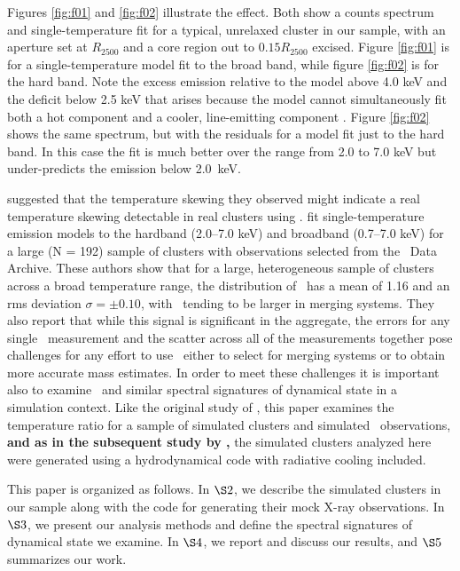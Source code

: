 \documentclass[12pt,preprint]{aastex}
\begin{document}
Figures \ref{fig:f01} and \ref{fig:f02} illustrate the
effect.  Both show a counts spectrum and single-temperature fit for a
typical, unrelaxed cluster in our sample, with an aperture set at
$R_{2500}$ and a core region out to $0.15 R_{2500}$ excised.  Figure
\ref{fig:f01} is for a single-temperature model fit to the broad band,
while figure \ref{fig:f02} is for the hard band.  Note the excess
emission relative to the model above 4.0 keV and the deficit below 2.5
keV that arises because the model cannot simultaneously fit both a hot
component and a cooler, line-emitting component
\citep{2004MNRAS.354...10M}. Figure \ref{fig:f02} shows the same
spectrum, but with the residuals for a model fit just to the hard
band.  In this case the fit is much better over the range from 2.0 to
7.0 keV but under-predicts the emission below 2.0~keV.

\cite{mathiesen_four_2001} suggested that the temperature skewing they
observed might indicate a real temperature skewing detectable in real
clusters using \chandra.  \cite{cavagnolo_bandpass_2008} fit
single-temperature emission models to the hardband (2.0--7.0 keV) and
broadband (0.7--7.0 keV) for a large (N = 192) sample of clusters with
observations selected from the \chandra\ Data Archive.  These authors
show that for a large, heterogeneous sample of clusters across a broad
temperature range, the distribution of \thbr\ has a mean of 1.16 and
an rms deviation $\sigma = \pm0.10$, with \thbr\ tending to be larger
in merging systems.  They also report that while this signal is
significant in the aggregate, the errors for any single \thbr\
measurement and the scatter across all of the measurements together
pose challenges for any effort to use \thbr\ either to select for
merging systems or to obtain more accurate mass estimates.  In order
to meet these challenges it is important also to examine \thbr\ and
similar spectral signatures of dynamical state in a simulation
context.  Like the original study of \cite{mathiesen_four_2001}, this
paper examines the temperature ratio for a sample of simulated
clusters and simulated \chandra\ observations, 
{\bf and as in the subsequent study by \cite{valdarnini_substructure_2006}, }
the simulated clusters analyzed here were generated using a hydrodynamical code with radiative cooling included.

This paper is organized as follows.  In $\S2$, we describe the
simulated clusters in our sample along with the  code for
generating their mock X-ray observations.  In $\S3$, we present our
analysis methods and define the spectral signatures of dynamical state
we examine.  In $\S4$, we report and discuss our results, and $\S5$
summarizes our work.
\end{document}
